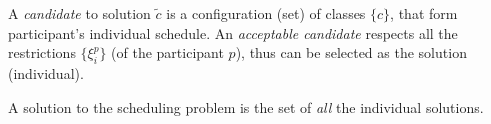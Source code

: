 \documentclass[ThesisDoc]{subfiles}
\begin{document}
A \emph{candidate} to solution $\tilde{c}$ is a configuration (set) of classes
$\{c\}$, that form participant's individual schedule. An \emph{acceptable candidate}
respects all the restrictions $\{\xi^p_i\}$ (of the participant $p$),
thus can be selected as the solution (individual).

\bigskip

\noindent
A solution to the scheduling problem is the set of \emph{all} the individual solutions.
\end{document}
